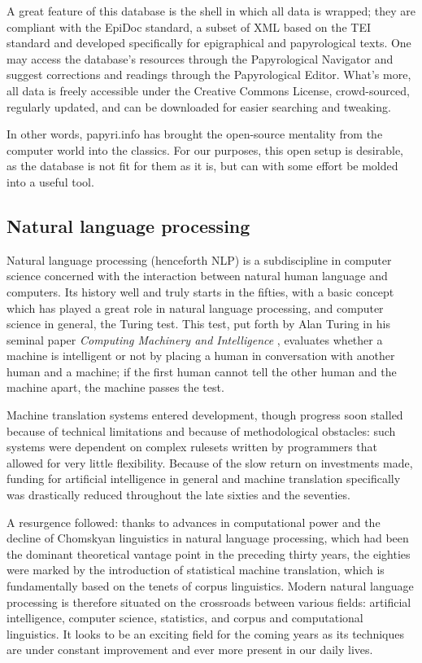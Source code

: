 A great feature of this database is the shell in which all data is wrapped;
they are compliant with the EpiDoc standard, a subset of XML based on the TEI
standard and developed specifically for epigraphical and papyrological texts.
One may access the database’s resources through the Papyrological Navigator and
suggest corrections and readings through the Papyrological Editor. What’s more,
all data is freely accessible under the Creative Commons License,
crowd-sourced, regularly updated, and can be downloaded for easier searching
and tweaking.

In other words, papyri.info has brought the open-source mentality from the
computer world into the classics. For our purposes, this open setup is
desirable, as the database is not fit for them as it is, but can with some
effort be molded into a useful tool.

\subsection{Natural language processing} 

Natural language processing (henceforth NLP) is a subdiscipline in computer
science concerned with the interaction between natural human language and
computers. Its history well and truly starts in the fifties, with a basic
concept which has played a great role in natural language processing, and
computer science in general, the Turing test. This test, put forth by Alan
Turing in his seminal paper \textit{Computing Machinery and Intelligence}
\citep{turing1950}, evaluates whether a machine is intelligent or not by
placing a human in conversation with another human and a machine; if the first
human cannot tell the other human and the machine apart, the machine passes the test.

Machine translation systems entered development, though progress soon stalled
because of technical limitations and because of methodological obstacles: such
systems were dependent on complex rulesets written by programmers that allowed
for very little flexibility. Because of the slow return on investments made,
funding for artificial intelligence in general and machine translation
specifically was drastically reduced throughout the late sixties and the seventies.

A resurgence followed: thanks to advances in computational power and the
decline of Chomskyan linguistics in natural language processing, which had been
the dominant theoretical vantage point in the preceding thirty years, the
eighties were marked by the introduction of statistical machine translation,
which is fundamentally based on the tenets of corpus linguistics. Modern
natural language processing is therefore situated on the crossroads between
various fields: artificial intelligence, computer science, statistics, and
corpus and computational linguistics. It looks to be an exciting field for the
coming years as its techniques are under constant improvement and ever more
present in our daily lives.

